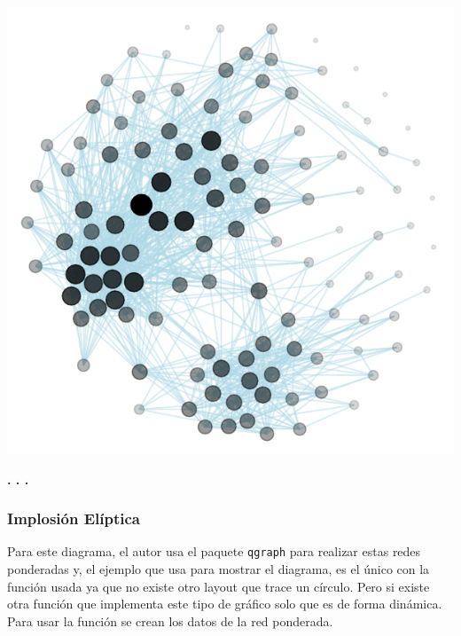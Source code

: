 \documentclass{article}\usepackage[]{graphicx}\usepackage[]{color}
\makeatletter
\def\maxwidth{ %
  \ifdim\Gin@nat@width>\linewidth
    \linewidth
  \else
    \Gin@nat@width
  \fi
}
\newenvironment{knitrout}{}{} %
\makeatother
\begin{document}
\begin{knitrout}
\color{fgcolor}

{\centering \includegraphics[width=\maxwidth]{figure/explo_red-1} 

}



\end{knitrout}
\begin{center}
\textbf{. . .}
\end{center}
\subsubsection{Implosi\'on El\'iptica}
Para este diagrama, el autor usa el paquete \texttt{qgraph} \cite{docu_qgraph}
para realizar estas redes ponderadas y, el ejemplo que usa para mostrar el diagrama, es el \'unico con la funci\'on usada ya que no existe otro layout que trace un c\'irculo. Pero si existe otra funci\'on que implementa este tipo de gr\'afico solo que es de forma din\'amica.~\\
Para usar la funci\'on se crean los datos de la red ponderada.
\end{document}
